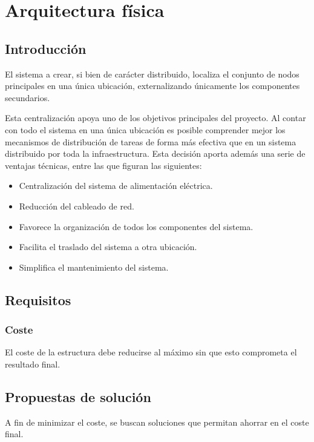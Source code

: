 \chapter{Arquitectura física}

\section{Introducción}

El sistema a crear, si bien de carácter distribuido, localiza el conjunto de nodos principales en una única ubicación, externalizando únicamente los componentes secundarios.

Esta centralización apoya uno de los objetivos principales del proyecto. Al contar con todo el sistema en una única ubicación es posible comprender mejor los mecanismos de distribución de tareas de forma más efectiva que en un sistema distribuido por toda la infraestructura. Esta decisión aporta además una serie de ventajas técnicas, entre las que figuran las siguientes:

\begin{itemize}
\item Centralización del sistema de alimentación eléctrica.
\item Reducción del cableado de red.
\item Favorece la organización de todos los componentes del sistema.
\item Facilita el traslado del sistema a otra ubicación.
\item Simplifica el mantenimiento del sistema.
\end{itemize}

\section{Requisitos}

\subsection{Coste}

El coste de la estructura debe reducirse al máximo sin que esto comprometa el resultado final.

\section{Propuestas de solución}

A fin de minimizar el coste, se buscan soluciones que permitan ahorrar en el coste final.

